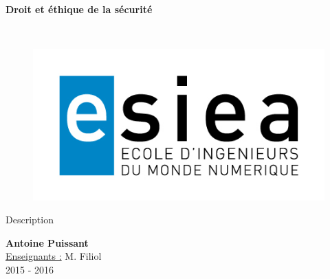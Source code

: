 \begin{titlepage}
      \begin{center}   
        \Huge
        \textbf{Droit et éthique de la sécurité}
        
        \LARGE
        ~
        
        
        \vfill
        \begin{figure}[H]
	    \centering
	    \begin{minipage}{0.9\textwidth}
		\centering
		\includegraphics[width=\textwidth]{./img/esiea.jpeg}
	    \end{minipage}\hfill
	\end{figure}
        \vfill
        
        \vspace{0.5cm}
        
        Description
        
        \vspace{2cm}
        \textbf{Antoine Puissant}\\
        \vspace{0.8cm}
        \Large
        \underline{Enseignants :} M. Filiol\\
        \vspace{0.5cm}
        2015 - 2016%
        
    \end{center}
\end{titlepage}